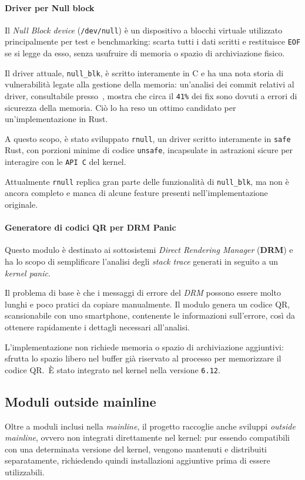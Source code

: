 \paragraph{Driver per Null block}
Il \textit{Null Block device} (\texttt{/dev/null}) è un dispositivo a blocchi virtuale utilizzato principalmente per test e benchmarking: scarta tutti i dati scritti e restituisce \texttt{EOF} se si legge da esso, senza usufruire di memoria o spazio di archiviazione fisico.

Il driver attuale, \texttt{null\_blk}, è scritto interamente in C e ha una nota storia di vulnerabilità legate alla gestione della memoria: un'analisi dei 
commit relativi al driver, consultabile presso~\cite{null-blk}, mostra che circa il \texttt{41\%} dei fix sono dovuti a errori di sicurezza della memoria.
Ciò lo ha reso un ottimo candidato per un'implementazione in Rust.

A questo scopo, è stato sviluppato \texttt{rnull}, un driver scritto interamente in \texttt{safe} Rust, con porzioni minime di codice \texttt{unsafe}, incapsulate in astrazioni sicure
 per interagire con le \texttt{API C} del kernel.

 Attualmente \texttt{rnull} replica gran parte delle funzionalità di \texttt{null\_blk}, ma non è ancora completo e manca di alcune feature presenti nell'implementazione originale.

\paragraph{Generatore di codici QR per DRM Panic}
Questo modulo è destinato ai sottosistemi \textit{Direct Rendering Manager} (\textbf{DRM}) e ha lo scopo di semplificare l'analisi degli 
\textit{stack trace} generati in seguito a un \textit{kernel panic}.

Il problema di base è che i messaggi di errore del \textit{DRM} possono essere molto lunghi e poco pratici da copiare manualmente.
Il modulo genera un codice QR, scansionabile con uno smartphone, contenente le informazioni sull'errore, così da ottenere 
rapidamente i dettagli necessari all'analisi.

L'implementazione non richiede memoria o spazio di archiviazione aggiuntivi: sfrutta lo spazio 
libero nel buffer già riservato al processo per memorizzare il codice QR.\ 
È stato integrato nel kernel nella versione \texttt{6.12}.

\subsection{Moduli outside mainline}
Oltre a moduli inclusi nella \textit{mainline}, il progetto raccoglie anche sviluppi \textit{outside mainline}, ovvero non integrati direttamente nel kernel: 
pur essendo compatibili con una determinata versione del kernel, vengono mantenuti e distribuiti separatamente, richiedendo quindi installazioni
 aggiuntive prima di essere utilizzabili.

